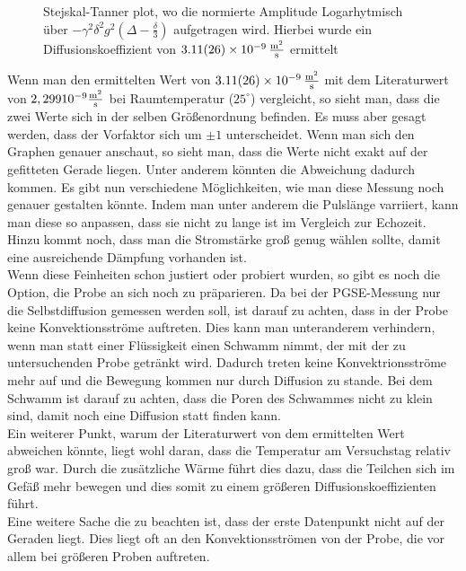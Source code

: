 \begin{figure}[H]
    \centering
    
    \caption{Stejskal-Tanner plot, wo die normierte Amplitude Logarhytmisch über $-\gamma^2\delta^2g^2\left(\Delta-\frac{\delta}{3}\right)$ aufgetragen wird. Hierbei wurde ein Diffusionskoeffizient von $\SI{3,11(26)e-9}{\frac{\m^2}{s}}$ ermittelt}
\end{figure}
 Wenn man den ermittelten Wert von $\SI{3,11(26)e-9}{\frac{\m^2}{s}}$ mit dem Literaturwert von $2,299  10^{-9}\si{\frac{\m^2}{\s}}$ bei Raumtemperatur ($25^{\circ}$) vergleicht\cite{Diff}, so sieht man, dass die zwei Werte sich in der selben Größenordnung befinden. Es muss aber gesagt werden, dass der Vorfaktor sich um $\pm 1$ unterscheidet. Wenn man sich den Graphen  genauer anschaut, so sieht man, dass die Werte nicht exakt auf der gefitteten Gerade liegen. Unter anderem könnten die Abweichung dadurch kommen. 
Es gibt nun verschiedene Möglichkeiten, wie man diese Messung noch genauer gestalten könnte. Indem man unter anderem die Pulslänge varriiert, kann man diese so anpassen, dass sie nicht zu lange ist im Vergleich zur Echozeit. Hinzu kommt noch, dass man die Stromstärke groß genug wählen sollte, damit eine ausreichende Dämpfung vorhanden ist.\\
Wenn diese Feinheiten schon justiert oder probiert wurden, so gibt es noch die Option, die Probe an sich noch zu präparieren. Da bei der PGSE-Messung nur die Selbstdiffusion gemessen werden soll, ist darauf zu achten, dass in der Probe keine Konvektionsströme auftreten. Dies kann man unteranderem verhindern, wenn man statt einer Flüssigkeit einen Schwamm nimmt, der mit der zu untersuchenden Probe getränkt wird. Dadurch treten keine Konvektrionsströme mehr auf und die Bewegung kommen nur durch Diffusion zu stande. Bei dem Schwamm ist darauf zu achten, dass die Poren des Schwammes nicht zu klein sind, damit noch eine Diffusion statt finden kann.\\
Ein weiterer Punkt, warum der Literaturwert von dem ermittelten Wert abweichen könnte, liegt wohl daran, dass die Temperatur am Versuchstag relativ groß war. Durch die zusätzliche Wärme führt dies dazu, dass die Teilchen sich im Gefäß mehr bewegen und dies somit zu einem größeren Diffusionskoeffizienten führt.\\
Eine weitere Sache die zu beachten ist, dass der erste Datenpunkt nicht auf der Geraden liegt. Dies liegt oft an den Konvektionsströmen von der Probe, die vor allem bei größeren Proben auftreten.
